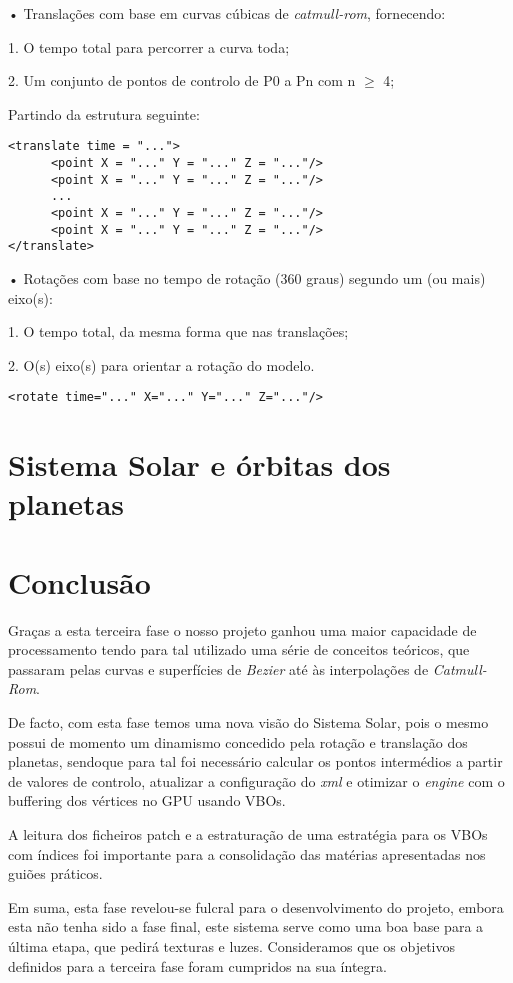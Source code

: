 \documentclass[11pt,a4paper]{report}
\begin{document}
• Translações com base em curvas cúbicas de \emph{catmull-rom}, fornecendo:

1. O tempo total para percorrer a curva toda;

2. Um conjunto de pontos de controlo de P0 a Pn com n $\ge$ 4;

Partindo da estrutura seguinte:

\begin{lstlisting}[style = xml]
<translate time = "...">
      <point X = "..." Y = "..." Z = "..."/>
      <point X = "..." Y = "..." Z = "..."/>
      ...
      <point X = "..." Y = "..." Z = "..."/>
      <point X = "..." Y = "..." Z = "..."/>
</translate>
\end{lstlisting}

• Rotações com base no tempo de rotação (360 graus) segundo um (ou mais) eixo(s):

1. O tempo total, da mesma forma que nas translações;

2. O(s) eixo(s) para orientar a rotação do modelo.

\begin{lstlisting}[style = xml]
<rotate time="..." X="..." Y="..." Z="..."/>
\end{lstlisting}
\chapter{Sistema Solar e órbitas dos planetas}

\chapter{Conclusão}

Graças a esta terceira fase o nosso projeto ganhou uma maior capacidade de processamento tendo para tal utilizado uma série de conceitos teóricos, que passaram pelas  curvas e superfícies de \emph{Bezier} até às interpolações de \emph{Catmull-Rom}.

De facto, com esta fase temos uma nova visão do Sistema Solar, pois o mesmo possui de momento um dinamismo concedido pela rotação e translação dos planetas, sendoque para tal foi necessário calcular os pontos intermédios a partir de valores de controlo, atualizar a configuração do \emph{xml} e otimizar o \emph{engine} com o buffering dos vértices no GPU usando VBOs.

A leitura dos ficheiros patch e a estraturação de uma estratégia para os VBOs com índices foi importante para a consolidação das matérias apresentadas nos guiões práticos.

Em suma, esta fase revelou-se fulcral para o desenvolvimento do projeto, embora esta não tenha sido a fase final, este sistema serve como uma boa base para a última etapa, que pedirá texturas e luzes. Consideramos que os objetivos definidos para a terceira fase foram cumpridos na sua íntegra.
\end{document}
